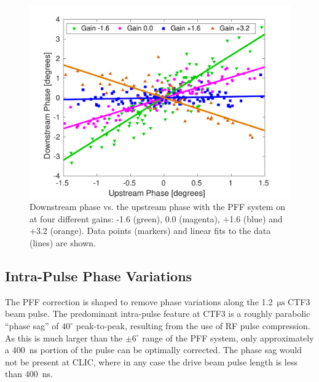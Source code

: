 \documentclass[%
 reprint,
 amsmath,amssymb,
 prl,
]{revtex4-1}
\begin{document}
\begin{figure}
\includegraphics[width=\columnwidth]{figs/gScan}%
\caption{\label{fig:gScan}Downstream phase vs. the upstream phase with the PFF 
system on at four different gains: -1.6 (green), 0.0 (magenta), +1.6 (blue) and 
+3.2 (orange). Data points (markers) and linear fits to the data (lines) are 
shown.}
\end{figure}

\subsection{\label{ss:shape}Intra-Pulse Phase Variations}

The PFF correction is shaped to remove phase variations along the 
1.2~\(\mathrm{\mu s}\) CTF3 beam pulse. The predominant intra-pulse feature at 
CTF3
is a roughly parabolic ``phase sag'' of \(40^\circ\) peak-to-peak, resulting 
from the use of RF pulse compression. As this is much larger than the 
\(\pm 6^\circ\) range of the PFF system, only approximately a 400~ns portion of 
the pulse can be optimally corrected. The phase sag would not be present at 
CLIC, where in any case the drive beam pulse length is less than 400~ns.


\end{document}
